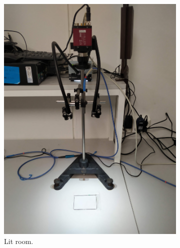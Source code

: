 \begin{figure}[h]
    \begin{subfigure}{0.3333\textwidth}
        \centering
        \includegraphics[width=0.95\linewidth]{figures/project_setup_lit.png}
        \caption{Lit room.}
        \label{fig:picture_of_setup_lit}
    \end{subfigure}%
    \begin{subfigure}{0.3333\textwidth}
        \centering

\end{subfigure}
\end{figure}

